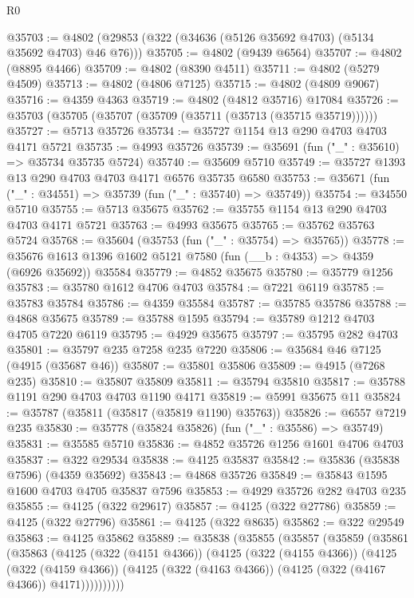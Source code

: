 \begin{lexlean}{R0}
\begin{coremodule}
@35703 := @4802 (@29853 (@322 (@34636 (@5126 @35692 @4703) (@5134 @35692 @4703) @46 @76)))
@35705 := @4802 (@9439 @6564)
@35707 := @4802 (@8895 @4466)
@35709 := @4802 (@8390 @4511)
@35711 := @4802 (@5279 @4509)
@35713 := @4802 (@4806 @7125)
@35715 := @4802 (@4809 @9067)
@35716 := @4359 @4363
@35719 := @4802 (@4812 @35716) @17084
@35726 := @35703 (@35705 (@35707 (@35709 (@35711 (@35713 (@35715 @35719))))))
@35727 := @5713 @35726
@35734 := @35727 @1154 @13 @290 @4703 @4703 @4171 @5721
@35735 := @4993 @35726
@35739 := @35691 (fun ("_" : @35610) => @35734 @35735 @5724)
@35740 := @35609 @5710
@35749 := @35727 @1393 @13 @290 @4703 @4703 @4171 @6576 @35735 @6580
@35753 := @35671 (fun ("_" : @34551) => @35739 (fun ("_" : @35740) => @35749))
@35754 := @34550 @5710
@35755 := @5713 @35675
@35762 := @35755 @1154 @13 @290 @4703 @4703 @4171 @5721
@35763 := @4993 @35675
@35765 := @35762 @35763 @5724
@35768 := @35604 (@35753 (fun ("_" : @35754) => @35765))
@35778 := @35676 @1613 @1396 @1602 @5121 @7580 (fun (__b : @4353) => @4359 (@6926 @35692)) @35584
@35779 := @4852 @35675
@35780 := @35779 @1256
@35783 := @35780 @1612 @4706 @4703
@35784 := @7221 @6119
@35785 := @35783 @35784
@35786 := @4359 @35584
@35787 := @35785 @35786
@35788 := @4868 @35675
@35789 := @35788 @1595
@35794 := @35789 @1212 @4703 @4705 @7220 @6119
@35795 := @4929 @35675
@35797 := @35795 @282 @4703
@35801 := @35797 @235 @7258 @235 @7220
@35806 := @35684 @46 @7125 (@4915 (@35687 @46))
@35807 := @35801 @35806
@35809 := @4915 (@7268 @235)
@35810 := @35807 @35809
@35811 := @35794 @35810
@35817 := @35788 @1191 @290 @4703 @4703 @1190 @4171
@35819 := @5991 @35675 @11
@35824 := @35787 (@35811 (@35817 (@35819 @1190) @35763))
@35826 := @6557 @7219 @235
@35830 := @35778 (@35824 @35826) (fun ("_" : @35586) => @35749)
@35831 := @35585 @5710
@35836 := @4852 @35726 @1256 @1601 @4706 @4703
@35837 := @322 @29534
@35838 := @4125 @35837
@35842 := @35836 (@35838 @7596) (@4359 @35692)
@35843 := @4868 @35726
@35849 := @35843 @1595 @1600 @4703 @4705 @35837 @7596
@35853 := @4929 @35726 @282 @4703 @235
@35855 := @4125 (@322 @29617)
@35857 := @4125 (@322 @27786)
@35859 := @4125 (@322 @27796)
@35861 := @4125 (@322 @8635)
@35862 := @322 @29549
@35863 := @4125 @35862
@35889 := @35838
    (@35855
      (@35857
        (@35859
          (@35861
            (@35863
              (@4125
                (@322 (@4151 @4366))
                (@4125
                  (@322 (@4155 @4366))
                  (@4125
                    (@322 (@4159 @4366))
                    (@4125 (@322 (@4163 @4366)) (@4125 (@322 (@4167 @4366)) @4171))))))))))

\end{coremodule}
\end{lexlean}
